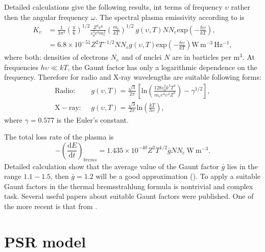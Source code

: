 \documentclass[oneside,a4paper,11pt]{report}
\begin{document}
Detailed calculations give the following results, int terms of frequency $\upsilon$ rather then the angular
frequency $\omega$. The spectral plasma emissivity according to \citet{longair:1} is
\begin{equation}
 \label{tbremss1}
\begin{split}
 K_\upsilon &= \frac{1}{3\pi^2}\left ( \frac{\pi}{6} \right )^{1/2} \frac{Z^2e^6}{\varepsilon^3_0c^3m_e^2} \left ( \frac{m_e}{kT} \right )^{1/2} \: g(\upsilon,T) N N_e \mathrm{exp}\left ( -\frac{h \upsilon}{kT} \right ), \\
 & = 6.8 \times 10^{-51} Z^2 T^{-1/2} N N_e g(\upsilon, T) \mathrm{exp}\left ( - \frac{h \upsilon}{kT} \right ) \mathrm{W\,m^{-3}\,Hz^{-1}},     
\end{split}
\end{equation}
where both: densities of electrons $N_e$ and of nuclei $N$ are in barticles per $\mathrm{m^3}$. At frequencies 
$h \upsilon \ll kT$, the Gaunt factor has only a logarithmic dependence on the frequency.  
Therefore for radio and X-ray wavelengths are suitable following forms:
\begin{equation}
 \label{approx_brem}
\begin{split}
 \mathrm{Radio:} & \: \:g(\upsilon, T) = \frac{\sqrt{3}}{2\pi}\left [ \mathrm{ln} \left ( \frac{128\varepsilon_0^2k^3T^3}{m_e e^4 \upsilon^2 Z^2} \right ) - \gamma^{1/2} \right ] ,\\
 \mathrm{X-ray:} & \: \:g(\upsilon, T) = \frac{\sqrt{3}}{2\pi} \mathrm{ln} \left ( \frac{kT}{h\upsilon} \right ),
\end{split}
\end{equation}
where $\gamma = 0.577$ is the Euler's constant. 

The total loss rate of the plasma is
\begin{equation}
 \label{thermbrems_f}
-\left ( \frac{\mathrm{d}E}{\mathrm{d}t} \right )_{brems} = 1.435 \times10^{-40}Z^2T^{1/2}\bar{g}N N_e \: \mathrm{W\:m^{-3}}.
\end{equation}
Detailed calculation show that the average value of the Gaunt factor $\bar{g}$ lies in the range 
$1.1 - 1.5$, then $\bar{g} = 1.2$ will be a good approximation (\citet{longair:1}).  
To apply a suitable Gaunt factors in the thermal bremsstrahlung formula is nontrivial and complex task.
Several useful papers about suitable Gaunt factors were published. One of the more recent is that from 
\citet{1998MNRAS.300..321S}.

\section{PSR model}
\end{document}

